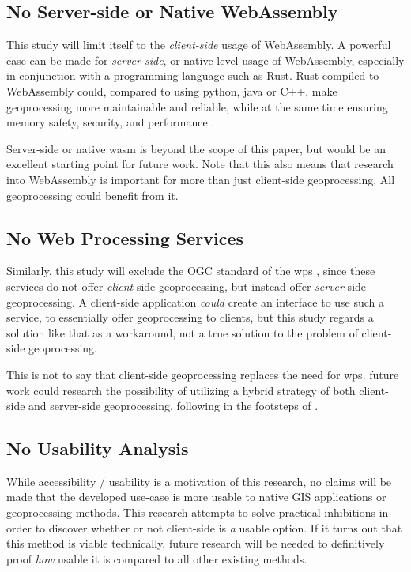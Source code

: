 \subsection*{ No Server-side or Native WebAssembly } 
This study will limit itself to the \emph{client-side} usage of WebAssembly. 
A powerful case can be made for \emph{server-side}, or native level usage of WebAssembly, especially in conjunction with a programming language such as Rust. 
Rust compiled to WebAssembly could, compared to using python, java or C++, make geoprocessing more maintainable and reliable, while at the same time ensuring memory safety, security, and performance \cite{clack_standardizing_2019}. 

Server-side or native wasm is beyond the scope of this paper, but would be an excellent starting point for future work. Note that this also means that research into WebAssembly is important for more than just client-side geoprocessing. All geoprocessing could benefit from it.



\subsection*{ No Web Processing Services } 
Similarly, this study will exclude the OGC standard of the \ac{wps} \cite{ogc_web_2015}, since these services do not offer \emph{client} side geoprocessing, but instead offer \emph{server} side geoprocessing. A client-side application \textit{could} create an interface to use such a service, to essentially offer geoprocessing to clients, but this study regards a solution like that as a workaround, not a true solution to the problem of client-side geoprocessing. 

This is not to say that client-side geoprocessing replaces the need for \ac{wps}. 
future work could research the possibility of utilizing a hybrid strategy of both client-side and server-side geoprocessing, following in the footsteps of \cite{panidi_hybrid_2015}. 



\subsection*{ No Usability Analysis } %
While accessibility / usability is a motivation of this research, no claims will be made that the developed use-case is more usable to native GIS applications or geoprocessing methods. This research attempts to solve practical inhibitions in order to discover whether or not client-side is \emph{a} usable option. If it turns out that this method is viable technically, future research will be needed to definitively proof \emph{how} usable it is compared to all other existing methods.  


